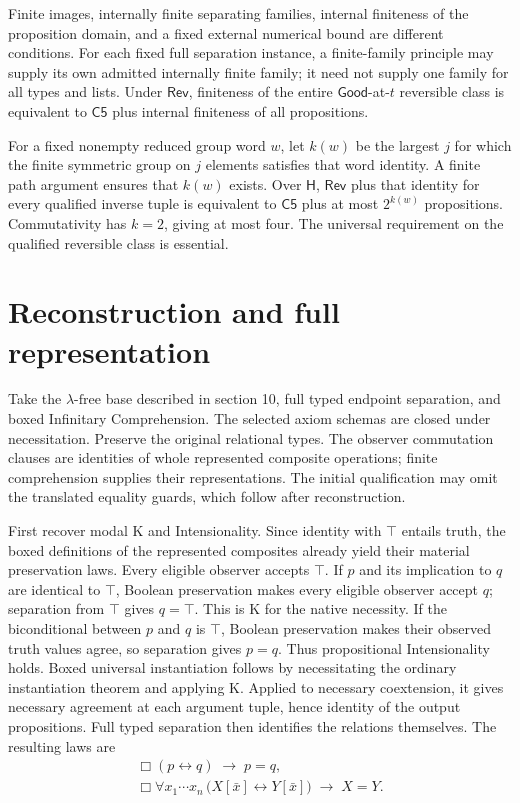 \documentclass[12pt,letterpaper]{article}
\newcommand{\Hlogic}{\mathsf{H}}
\newcommand{\Cfive}{\mathsf{C5}}
\newcommand{\Good}{\mathsf{Good}}
\newcommand{\Rev}{\mathsf{Rev}}
\begin{document}
Finite images, internally finite separating families, internal finiteness of the proposition domain, and a fixed external numerical bound are different conditions. For each fixed full separation instance, a finite-family principle may supply its own admitted internally finite family; it need not supply one family for all types and lists. Under $\Rev$, finiteness of the entire $\Good$-at-$t$ reversible class is equivalent to $\Cfive$ plus internal finiteness of all propositions.~\cite{r11}


For a fixed nonempty reduced group word $w$, let $k(w)$ be the largest $j$ for which the finite symmetric group on $j$ elements satisfies that word identity. A finite path argument ensures that $k(w)$ exists. Over $\Hlogic$, $\Rev$ plus that identity for every qualified inverse tuple is equivalent to $\Cfive$ plus at most $2^{k(w)}$ propositions. Commutativity has $k=2$, giving at most four. The universal requirement on the qualified reversible class is essential.~\cite[\S\S1--5]{r12}


\section{Reconstruction and full representation}

Take the $\lambda\text{-free}$ base described in section 10, full typed endpoint separation, and boxed Infinitary Comprehension. The selected axiom schemas are closed under necessitation. Preserve the original relational types. The observer commutation clauses are identities of whole represented composite operations; finite comprehension supplies their representations. The initial qualification may omit the translated equality guards, which follow after reconstruction.


First recover modal K and Intensionality. Since identity with $\top$ entails truth, the boxed definitions of the represented composites already yield their material preservation laws. Every eligible observer accepts $\top$. If $p$ and its implication to $q$ are identical to $\top$, Boolean preservation makes every eligible observer accept $q$; separation from $\top$ gives $q=\top$. This is K for the native necessity. If the biconditional between $p$ and $q$ is $\top$, Boolean preservation makes their observed truth values agree, so separation gives $p=q$. Thus propositional Intensionality holds. Boxed universal instantiation follows by necessitating the ordinary instantiation theorem and applying K. Applied to necessary coextension, it gives necessary agreement at each argument tuple, hence identity of the output propositions. Full typed separation then identifies the relations themselves. The resulting laws are
\begin{gather*}
\Box(p\leftrightarrow q)\;\longrightarrow\;p=q,\\
\Box\forall x_1\cdots x_n\,\bigl(X[\bar x]\leftrightarrow Y[\bar x]\bigr)\;\longrightarrow\;X=Y.
\end{gather*}
\end{document}
